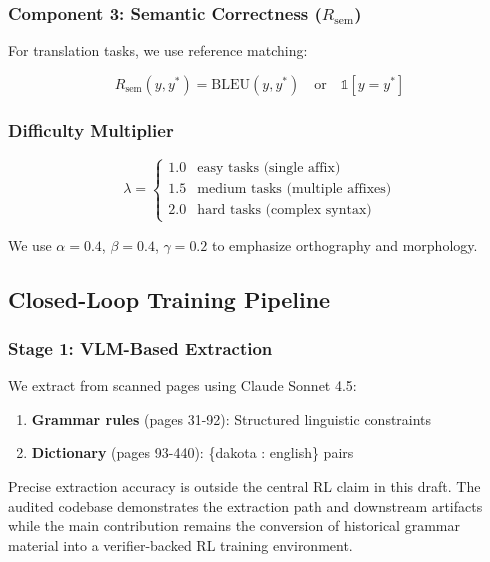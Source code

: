 \documentclass{article}
\newcommand{\Rsem}{R_{\text{sem}}}
\begin{document}
\subsubsection{Component 3: Semantic Correctness ($\Rsem$)}

For translation tasks, we use reference matching:

\begin{equation}
\Rsem(y, y^*) = \text{BLEU}(y, y^*) \quad \text{or} \quad \mathbb{1}[y = y^*]
\end{equation}

\subsubsection{Difficulty Multiplier}

\begin{equation}
\lambda = \begin{cases}
1.0 & \text{easy tasks (single affix)} \\
1.5 & \text{medium tasks (multiple affixes)} \\
2.0 & \text{hard tasks (complex syntax)}
\end{cases}
\end{equation}

We use $\alpha = 0.4$, $\beta = 0.4$, $\gamma = 0.2$ to emphasize orthography and morphology.

\subsection{Closed-Loop Training Pipeline}

\subsubsection{Stage 1: VLM-Based Extraction}

We extract from scanned pages using Claude Sonnet 4.5:
\begin{enumerate}
    \item \textbf{Grammar rules} (pages 31-92): Structured linguistic constraints
    \item \textbf{Dictionary} (pages 93-440): \{dakota : english\} pairs
\end{enumerate}

Precise extraction accuracy is outside the central RL claim in this draft. The audited codebase demonstrates the extraction path and downstream artifacts while the main contribution remains the conversion of historical grammar material into a verifier-backed RL training environment.
\end{document}
